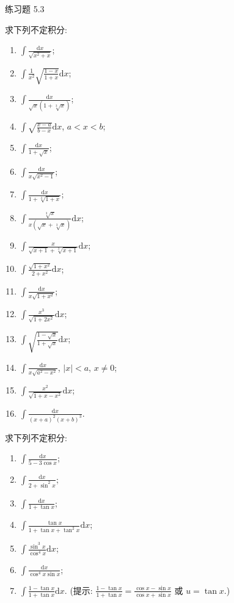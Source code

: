 \begin{exblock}{练习题 5.3}
  \item 求下列不定积分:
  \begin{enumerate}[label=(\arabic*)]
    \item $\int\frac{\mathrm{d}x}{\sqrt{x^{2}+x}}$;
    \item $\int\frac{1}{x^{2}}\sqrt{\frac{1-x}{1+x}}\mathrm{d}x$;
    \item $\int\frac{\mathrm{d}x}{\sqrt{x}(1+\sqrt[3]{x})}$;
    \item $\int\sqrt{\frac{x-a}{b-x}}\mathrm{d}x$, $a<x<b$;
    \item $\int\frac{\mathrm{d}x}{1+\sqrt{x}}$;
    \item $\int\frac{\mathrm{d}x}{x\sqrt{x^{2}-1}}$;
    \item $\int\frac{\mathrm{d}x}{1+\sqrt[3]{1+x}}$;
    \item $\int\frac{\sqrt[3]{x}}{x(\sqrt{x}+\sqrt[3]{x})}\mathrm{d}x$;
    \item $\int\frac{x}{\sqrt{x+1}+\sqrt[3]{x+1}}\mathrm{d}x$;
    \item $\int\frac{\sqrt{1+x^{2}}}{2+x^{2}}\mathrm{d}x$;
    \item $\int\frac{\mathrm{d}x}{x\sqrt{1+x^{2}}}$;
    \item $\int\frac{x^{3}}{\sqrt{1+2x^{2}}}\mathrm{d}x$;
    \item $\int\sqrt{\frac{1-\sqrt{x}}{1+\sqrt{x}}}\mathrm{d}x$;
    \item $\int\frac{\mathrm{d}x}{x\sqrt{a^{2}-x^{2}}}$, $|x|<a$, $x\neq 0$;
    \item $\int\frac{x^{2}}{\sqrt{1+x-x^{2}}}\mathrm{d}x$;
    \item $\int\frac{\mathrm{d}x}{(x+a)^{2}(x+b)^{3}}$.
  \end{enumerate}

  \item 求下列不定积分:
  \begin{enumerate}[label=(\arabic*)]
    \item $\int\frac{\mathrm{d}x}{5-3\cos x}$;
    \item $\int\frac{\mathrm{d}x}{2+\sin^{2}x}$;
    \item $\int\frac{\mathrm{d}x}{1+\tan x}$;
    \item $\int\frac{\tan x}{1+\tan x+\tan^{2}x}\mathrm{d}x$;
    \item $\int\frac{\sin^{3}x}{\cos^{4}x}\mathrm{d}x$;
    \item $\int\frac{\mathrm{d}x}{\cos^{4}x\sin x}$;
    \item $\int\frac{1-\tan x}{1+\tan x}\mathrm{d}x$. (提示: $\frac{1-\tan x}{1+\tan x}=\frac{\cos x-\sin x}{\cos x+\sin x}$ 或 $u=\tan x$.)
  \end{enumerate}
\end{exblock}
